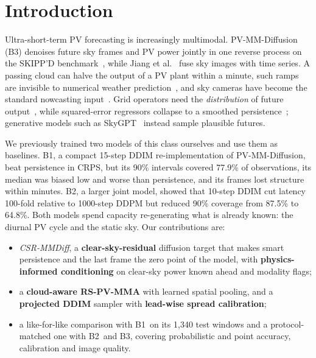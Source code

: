 \documentclass[conference]{IEEEtran}
\newcommand{\BOne}{B1}
\newcommand{\BTwo}{B2}
\newcommand{\BThree}{B3}
\begin{document}
\section{Introduction}
Ultra-short-term PV forecasting is increasingly multimodal. PV-MM-Diffusion~\cite{huang2026pvmm} (\BThree) denoises future sky frames and PV power jointly in one reverse process on the SKIPP'D benchmark~\cite{nie2023skippd}, while Jiang et al.~\cite{jiang2026sft} fuse sky images with time series. A passing cloud can halve the output of a PV plant within a minute, such ramps are invisible to numerical weather prediction~\cite{antonanzas2016review}, and sky cameras have become the standard nowcasting input~\cite{sun2019sunset,paletta2023advances}. Grid operators need the \emph{distribution} of future output~\cite{vandermeer2018review}, while squared-error regressors collapse to a smoothed persistence~\cite{paletta2021benchmarking}; generative models such as SkyGPT~\cite{nie2024skygpt} instead sample plausible futures.

We previously trained two models of this class ourselves and use them as baselines. \BOne, a compact 15-step DDIM re-implementation of PV-MM-Diffusion, beat persistence in CRPS, but its 90\% intervals covered 77.9\% of observations, its median was biased low and worse than persistence, and its frames lost structure within minutes. \BTwo, a larger joint model, showed that 10-step DDIM cut latency 100-fold relative to 1000-step DDPM but reduced 90\% coverage from 87.5\% to 64.8\%. Both models spend capacity re-generating what is already known: the diurnal PV cycle and the static sky. Our contributions are:
\begin{itemize}
\item \emph{CSR-MMDiff}, a \textbf{clear-sky-residual} diffusion target that makes smart persistence and the last frame the zero point of the model, with \textbf{physics-informed conditioning} on clear-sky power known ahead and modality flags;
\item a \textbf{cloud-aware RS-PV-MMA} with learned spatial pooling, and a \textbf{projected DDIM} sampler with \textbf{lead-wise spread calibration};
\item a like-for-like comparison with \BOne\ on its 1{,}340 test windows and a protocol-matched one with \BTwo\ and \BThree, covering probabilistic and point accuracy, calibration and image quality.
\end{itemize}
\end{document}
